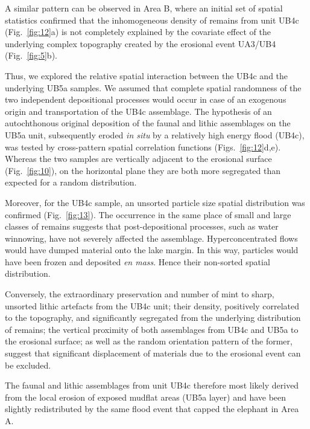 \documentclass[preprint,authoryear,times]{elsarticle} %
\begin{document}

A similar pattern can be observed in Area B, where an initial set of spatial statistics confirmed that the inhomogeneous density of remains from unit UB4c (Fig.~\ref{fig:12}a) is not completely explained by the covariate effect of the underlying complex topography created by the erosional event UA3/UB4 (Fig.~\ref{fig:5}b).

Thus, we explored the relative spatial interaction between the UB4c and the underlying UB5a samples. We assumed that complete spatial randomness of the two independent depositional processes would occur in case of an exogenous origin and transportation of the UB4c assemblage. The hypothesis of an autochthonous original deposition of the faunal and lithic assemblages on the UB5a unit, subsequently eroded \emph{in situ} by a relatively high energy flood (UB4c), was tested by cross-pattern spatial correlation functions (Figs.~\ref{fig:12}d,e). Whereas the two samples are vertically adjacent to the erosional surface (Fig.~\ref{fig:10}), on the horizontal plane they are both more segregated than expected for a random distribution.

Moreover, for the UB4c sample, an unsorted particle size spatial distribution was confirmed (Fig.~\ref{fig:13}). The occurrence in the same place of small and large classes of remains suggests that post-depositional processes, such as water winnowing, have not severely affected the assemblage. Hyperconcentrated flows would have dumped material onto the lake margin. In this way, particles would have been frozen and deposited \emph{en mass}. Hence their non-sorted spatial distribution.

Conversely, the extraordinary preservation and number of mint to sharp, unsorted lithic artefacts from the UB4c unit; their density, positively correlated to the topography, and significantly segregated from the underlying distribution of remains; the vertical proximity of both assemblages from UB4c and UB5a to the erosional surface; as well as the random orientation pattern of the former, suggest that significant displacement of materials due to the erosional event can be excluded.

The faunal and lithic assemblages from unit UB4c therefore most likely derived from the local erosion of exposed mudflat areas (UB5a layer) and have been slightly redistributed by the same flood event that capped the elephant in Area A.
\end{document}
